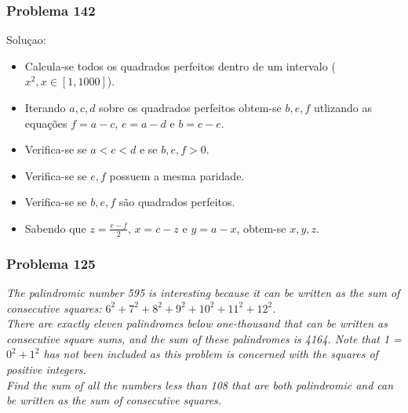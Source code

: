 \documentclass{beamer}
\begin{document}
\begin{frame}
    \frametitle{Problema 142}

    Soluçao: \\

    \begin{itemize}
        \item Calcula-se todos os quadrados perfeitos dentro de um intervalo ($x^2, x \in [1, 1000]$).
        \item Iterando $a, c, d$ sobre os quadrados perfeitos obtem-se $b, e, f$ utlizando as equações $f=a-c$, $e=a-d$ e $b=c-e$.
        \item Verifica-se se $a<c<d$ e se $b, e, f > 0$.
        \item Verifica-se se $e, f$ possuem a mesma paridade.
        \item Verifica-se se $b, e, f$ são quadrados perfeitos.
        \item Sabendo que $z=\frac{e-f}{2}$, $x=c-z$ e $y=a-x$, obtem-se $x, y, z$.
    \end{itemize}

    \begin{center}
    \end{center}
\end{frame}


\begin{frame}
    \frametitle{Problema 125}

    \begin{center}
        \textit{
            The palindromic number 595 is interesting because it can be written as the sum of consecutive squares: $6^2 + 7^2 + 8^2 + 9^2 + 10^2 + 11^2 + 12^2$. \\
            There are exactly eleven palindromes below one-thousand that can be written as consecutive square sums, and the sum of these palindromes is 4164. Note that 1 = $0^2 + 1^2$ has not been included as this problem is concerned with the squares of positive integers. \\
            Find the sum of all the numbers less than 108 that are both palindromic and can be written as the sum of consecutive squares.
        }
    \end{center}
\end{frame}
\end{document}
